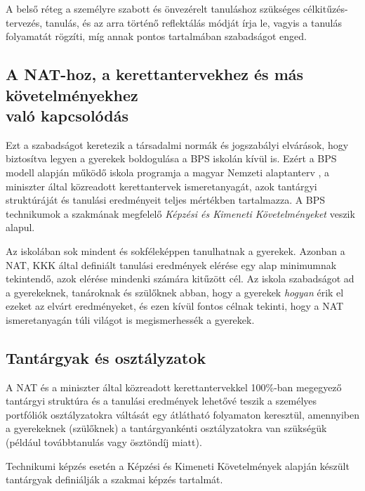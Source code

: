 A belső réteg a személyre szabott és önvezérelt tanuláshoz szükséges
célkitűzés-tervezés, tanulás, és az arra történő reflektálás módját írja
le, vagyis a tanulás folyamatát rögzíti, míg annak pontos tartalmában
szabadságot enged.

\hypertarget{nat-hoz-a-kerettantervekhez-es-mas-kovetelmenyekhez-valo-kapcsolodas}{%
\subsection{A NAT-hoz, a kerettantervekhez és más követelményekhez\\ való
kapcsolódás}\label{nat-hoz-a-kerettantervekhez-es-mas-kovetelmenyekhez-valo-kapcsolodas}}

Ezt a szabadságot keretezik a társadalmi normák és jogszabályi
elvárások, hogy biztosítva legyen a gyerekek boldogulása a BPS iskolán
kívül is. Ezért a BPS modell alapján működő iskola programja a magyar
Nemzeti alaptanterv {\autocite{Nat2020}}, a miniszter által közreadott
kerettantervek {\autocite{Kerettanterv2020}} ismeretanyagát, azok
tantárgyi struktúráját és tanulási eredményeit teljes mértékben
tartalmazza. A BPS technikumok a szakmának megfelelő \emph{Képzési és
Kimeneti Követelményeket} veszik alapul.

Az iskolában sok mindent és sokféleképpen tanulhatnak a gyerekek. Azonban
a NAT, KKK által definiált tanulási eredmények elérése egy alap
minimumnak tekintendő, azok elérése mindenki számára kitűzött cél. Az
iskola szabadságot ad a gyerekeknek, tanároknak és szülőknek abban,\break
hogy
a gyerekek \emph{hogyan} érik el ezeket az elvárt eredményeket, és ezen
kívül fontos célnak tekinti, hogy a NAT ismeretanyagán túli világot is
megismerhessék a gyerekek.

\hypertarget{tantargyak-es-osztalyzatok}{%
\subsection{Tantárgyak és
osztályzatok}\label{tantargyak-es-osztalyzatok}}

A NAT és a miniszter által közreadott kerettantervekkel 100\%-ban
megegyező tantárgyi struktúra és a tanulási eredmények lehetővé teszik a
személyes portfóliók osztályzatokra váltását egy átlátható folyamaton
keresztül, amennyiben a gyerekeknek (szülőknek) a tantárgyankénti
osztályzatokra van szükségük (például továbbtanulás vagy ösztöndíj
miatt).

Technikumi képzés esetén a Képzési és Kimeneti Követelmények alapján
készült tantárgyak definiálják a szakmai képzés tartalmát.

